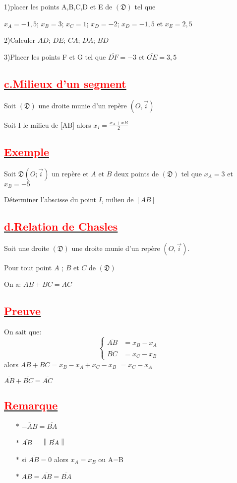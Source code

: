 \documentclass[12pt]{article}
\begin{document}
1)placer les points A,B,C,D et E de $(\mathfrak{D})$ tel que 

$x_{A}=-1,5$; $x_{B}=3$; $x_{C}=1$; $x_{D}=-2$; $x_{D}=-1,5$ et $x_{E}=2,5$

2)Calculer $\overline{AD}$; $\overline{DE}$; $\overline{CA}$; $\overline{DA}$; $\overline{BD}$

3)Placer les points F et G tel que $\overline{DF}=-3$ et $\overline{GE}=3,5$
\subsection*{\underline{\textcolor{red}{\textbf{c.Milieux d'un segment}}}}
Soit $(\mathfrak{D})$ une droite munie d'un repère $(O,\vec{i})$

Soit I le milieu de [AB] alors $x_{I}=\frac{x_{A}+x{B}}{2}$

\subsection*{\underline{\textcolor{red}{\textbf{Exemple}}}}
Soit $\mathfrak{D}(O;\vec{i})$ un repère et $A$ et $B$ deux points de $(\mathfrak{D})$ tel que $x_{A}=3$ et $x_{B}=-5$

Déterminer l'abscisse du point $I$, milieu de $[AB]$
\subsection*{\underline{\textcolor{red}{\textbf{d.Relation de Chasles}}}}
Soit une droite $(\mathfrak{D})$ une droite munie d'un repère $(O,\vec{i})$.

Pour tout point $A$ ; $B$ et $C$ de $(\mathfrak{D})$ 

On a: $\overline{AB}+\overline{BC}=\overline{AC}$
\subsection*{\underline{\textcolor{red}{\textbf{Preuve}}}}
On sait que: \[
    \begin{cases}
        \overline{AB} &= x_{B}-x_{A} \\
        \overline{BC} &= x_{C}-x_{B}
    \end{cases}
    \]
alors $\overline{AB}+\overline{BC}=x_{B}-x_{A}+x_{C}-x_{B}$
$=x_{C}-x_{A}$

$\overline{AB}+\overline{BC}=\overline{AC}$
\subsection*{\underline{\textcolor{red}{\textbf{Remarque}}}}
\begin{itemize}
    \item[$\ast $] $\overline{-AB}=\overline{BA}$
    \item[$\ast $] $\overline{AB}=\left\lVert \overline{BA} \right\rVert $
    \item[$\ast $] si $\overline{AB}=0$ alors $x_{A}=x_{B}$ ou A=B
    \item[$\ast $] $AB=\overline{AB}=\overline{BA}$
\end{itemize}
\end{document}
